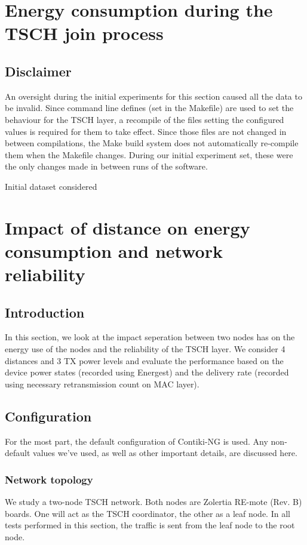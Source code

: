 \documentclass[conference]{IEEEtran}
\renewcommand\_{\textunderscore\allowbreak}
\begin{document}
\section{Energy consumption during the TSCH join process}
\label{section:task2}



\subsection{Disclaimer}

An oversight during the initial experiments for this section caused all the data to be invalid. Since command line defines (set in the Makefile) are used to set the behaviour for the TSCH layer, a recompile of the files setting the configured values is required for them to take effect. Since those files are not changed in between compilations, the Make build system does not automatically re-compile them when the Makefile changes. During our initial experiment set, these were the only changes made in between runs of the software. 

Initial dataset considered 


\section{Impact of distance on energy consumption and network reliability}
\label{section:task3}
\subsection{Introduction}

In this section, we look at the impact seperation between two nodes has on the energy use of the nodes and the reliability of the TSCH layer. We consider 4 distances and 3 TX power levels and evaluate the performance based on the device power states (recorded using Energest) and the delivery rate (recorded using necessary retransmission count on MAC layer). 

\subsection{Configuration} 
For the most part, the default configuration of Contiki-NG is used. Any non-default values we've used, as well as other important details, are discussed here.

\subsubsection{Network topology}
We study a two-node TSCH network. Both nodes are Zolertia RE-mote (Rev. B) boards. One will act as the TSCH coordinator, the other as a leaf node. In all tests performed in this section, the traffic is sent from the leaf node to the root node. 
\end{document}
